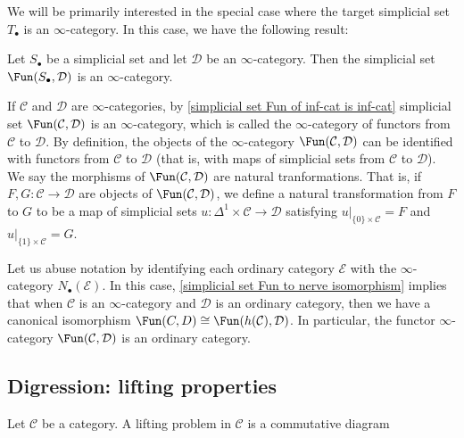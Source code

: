 We will be primarily interested in the special case where the target simplicial set $T_\bullet$ is an $\infty$-category. In this case, we have the following result:
\begin{theorem}\label{simplicial set Fun of inf-cat is inf-cat}
Let $S_\bullet$ be a simplicial set and let $\mathcal{D}$ be an $\infty$-category. Then the simplicial set $\Fun(S_\bullet,\mathcal{D})$ is an $\infty$-category.
\end{theorem}
If $\mathcal{C}$ and $\mathcal{D}$ are $\infty$-categories, by \cref{simplicial set Fun of inf-cat is inf-cat} simplicial set $\Fun(\mathcal{C},\mathcal{D})$ is an $\infty$-category, which is called the $\infty$-category of functors from $\mathcal{C}$ to $\mathcal{D}$. By definition, the objects of the $\infty$-category $\Fun(\mathcal{C},\mathcal{D})$ can be identified with functors from $\mathcal{C}$ to $\mathcal{D}$ (that is, with maps of simplicial sets from $\mathcal{C}$ to $\mathcal{D}$). We say the morphisms of $\Fun(\mathcal{C},\mathcal{D})$ are natural tranformations. That is, if $F,G:\mathcal{C}\to\mathcal{D}$ are objects of $\Fun(\mathcal{C},\mathcal{D})$, we define a natural transformation from $F$ to $G$ to be a map of simplicial sets $u:\Delta^1\times\mathcal{C}\to\mathcal{D}$ satisfying $u|_{\{0\}\times\mathcal{C}}=F$ and $u|_{\{1\}\times\mathcal{C}}=G$.\par
Let us abuse notation by identifying each ordinary category $\mathcal{E}$ with the $\infty$-category $N_\bullet(\mathcal{E})$. In this case, \cref{simplicial set Fun to nerve isomorphism} implies that when $\mathcal{C}$ is an $\infty$-category and $\mathcal{D}$ is an ordinary category, then we have a canonical isomorphism $\Fun(C,D)\cong\Fun(h(\mathcal{C}),\mathcal{D})$. In particular, the functor $\infty$-category $\Fun(\mathcal{C},\mathcal{D})$ is an ordinary category.
\subsection{Digression: lifting properties}
Let $\mathcal{C}$ be a category. A lifting problem in $\mathcal{C}$ is a commutative diagram